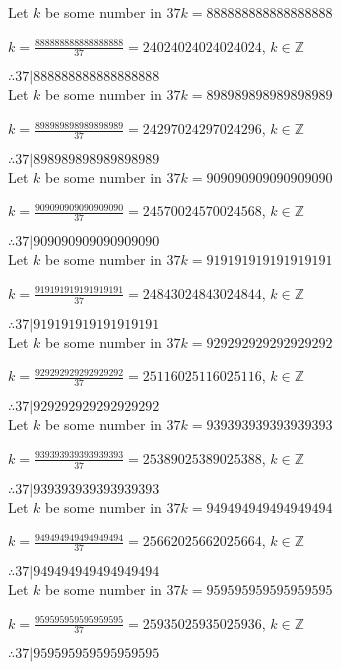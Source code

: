 \documentclass{article}
\begin{document}
Let $k$ be some number in $37k = 888888888888888888$

$k = \frac{888888888888888888}{37} = 24024024024024024$, $k \in \mathbb{Z}$

$ \therefore  37|888888888888888888 $ \\

Let $k$ be some number in $37k = 898989898989898989$

$k = \frac{898989898989898989}{37} = 24297024297024296$, $k \in \mathbb{Z}$

$ \therefore  37|898989898989898989 $ \\

Let $k$ be some number in $37k = 909090909090909090$

$k = \frac{909090909090909090}{37} = 24570024570024568$, $k \in \mathbb{Z}$

$ \therefore  37|909090909090909090 $ \\

Let $k$ be some number in $37k = 919191919191919191$

$k = \frac{919191919191919191}{37} = 24843024843024844$, $k \in \mathbb{Z}$

$ \therefore  37|919191919191919191 $ \\

Let $k$ be some number in $37k = 929292929292929292$

$k = \frac{929292929292929292}{37} = 25116025116025116$, $k \in \mathbb{Z}$

$ \therefore  37|929292929292929292 $ \\

Let $k$ be some number in $37k = 939393939393939393$

$k = \frac{939393939393939393}{37} = 25389025389025388$, $k \in \mathbb{Z}$

$ \therefore  37|939393939393939393 $ \\

Let $k$ be some number in $37k = 949494949494949494$

$k = \frac{949494949494949494}{37} = 25662025662025664$, $k \in \mathbb{Z}$

$ \therefore  37|949494949494949494 $ \\

Let $k$ be some number in $37k = 959595959595959595$

$k = \frac{959595959595959595}{37} = 25935025935025936$, $k \in \mathbb{Z}$

$ \therefore  37|959595959595959595 $ \\
\end{document}
